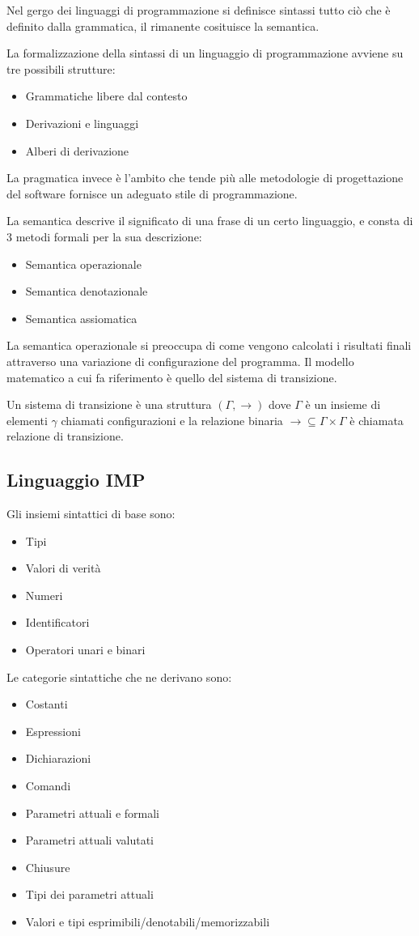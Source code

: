 \documentclass{article}[10pt]
\begin{document}
	Nel gergo dei linguaggi di programmazione si definisce sintassi tutto ciò che è definito dalla grammatica, il rimanente cosituisce la semantica.
	
	La formalizzazione della sintassi di un linguaggio di programmazione avviene su tre possibili strutture:
	\begin{itemize}
		\item Grammatiche libere dal contesto
		\item Derivazioni e linguaggi
		\item Alberi di derivazione
	\end{itemize}

	La pragmatica invece è l'ambito che tende più alle metodologie di progettazione del software fornisce un adeguato stile di programmazione.
	
	La semantica descrive il significato di una frase di un certo linguaggio, e consta di 3 metodi formali per la sua descrizione:
	\begin{itemize}
		\item Semantica operazionale
		\item Semantica denotazionale
		\item Semantica assiomatica
	\end{itemize}

	La semantica operazionale si preoccupa di come vengono calcolati i risultati finali attraverso una variazione di configurazione del programma. Il modello matematico a cui fa riferimento è quello del sistema di transizione.
	
	Un sistema di transizione è una struttura $(\Gamma, \to)$ dove $\Gamma$ è un insieme di elementi $\gamma$ chiamati configurazioni e la relazione binaria $\to\subseteq \Gamma \times \Gamma $ è chiamata relazione di transizione.
	
	\subsection{Linguaggio IMP}
	Gli insiemi sintattici di base sono:
	\begin{itemize}
		\item Tipi 
		\item Valori di verità
		\item Numeri
		\item Identificatori
		\item Operatori unari e binari
	\end{itemize}

	Le categorie sintattiche che ne derivano sono:
	\begin{itemize}
		\item Costanti 
		\item Espressioni
		\item Dichiarazioni
		\item Comandi
		\item Parametri attuali e formali
		\item Parametri attuali valutati
		\item Chiusure
		\item Tipi dei parametri attuali
		\item Valori e tipi esprimibili/denotabili/memorizzabili
	\end{itemize}
\end{document}
